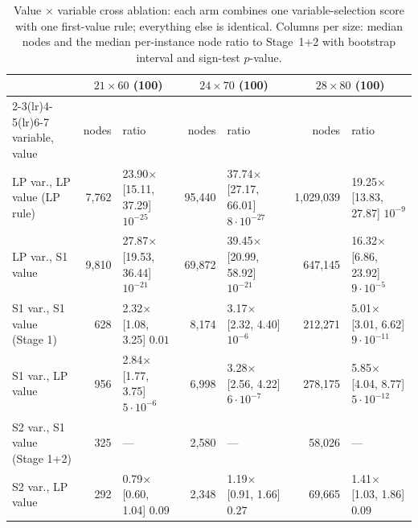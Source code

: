 \begin{table}[t]
\centering
\caption{Value $\times$ variable cross ablation: each arm combines one variable-selection score with one first-value rule; everything else is identical. Columns per size: median nodes and the median per-instance node ratio to Stage~1+2 with bootstrap interval and sign-test $p$-value.}
\label{tab:cross}
\scriptsize
\begin{tabular}{lrlrlrl}
\toprule
 & \multicolumn{2}{c}{$21\times60$ (100)} & \multicolumn{2}{c}{$24\times70$ (100)} & \multicolumn{2}{c}{$28\times80$ (100)} \\
\cmidrule(lr){2-3}\cmidrule(lr){4-5}\cmidrule(lr){6-7}
variable, value & nodes & ratio & nodes & ratio & nodes & ratio \\
\midrule
LP var., LP value (LP rule) & 7,762 & 23.90$\times$ [15.11, 37.29] $10^{-25}$ & 95,440 & 37.74$\times$ [27.17, 66.01] $8\cdot10^{-27}$ & 1,029,039 & 19.25$\times$ [13.83, 27.87] $10^{-9}$ \\
LP var., S1 value & 9,810 & 27.87$\times$ [19.53, 36.44] $10^{-21}$ & 69,872 & 39.45$\times$ [20.99, 58.92] $10^{-21}$ & 647,145 & 16.32$\times$ [6.86, 23.92] $9\cdot10^{-5}$ \\
S1 var., S1 value (Stage 1) & 628 & 2.32$\times$ [1.08, 3.25] $0.01$ & 8,174 & 3.17$\times$ [2.32, 4.40] $10^{-6}$ & 212,271 & 5.01$\times$ [3.01, 6.62] $9\cdot10^{-11}$ \\
S1 var., LP value & 956 & 2.84$\times$ [1.77, 3.75] $5\cdot10^{-6}$ & 6,998 & 3.28$\times$ [2.56, 4.22] $6\cdot10^{-7}$ & 278,175 & 5.85$\times$ [4.04, 8.77] $5\cdot10^{-12}$ \\
S2 var., S1 value (Stage 1+2) & 325 & --- & 2,580 & --- & 58,026 & --- \\
S2 var., LP value & 292 & 0.79$\times$ [0.60, 1.04] $0.09$ & 2,348 & 1.19$\times$ [0.91, 1.66] $0.27$ & 69,665 & 1.41$\times$ [1.03, 1.86] $0.09$ \\
\bottomrule
\end{tabular}
\end{table}